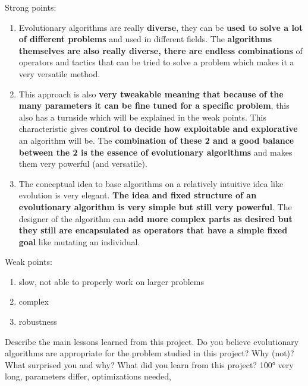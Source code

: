 \documentclass[a4paper,10pt]{article}
\newcommand{\ReplaceMe}[1]{{\color{blue}#1}}
\begin{document}
Strong points:
\begin{enumerate}
 \item Evolutionary algorithms are really \textbf{diverse}, they can be \textbf{used to solve a lot of different problems} and used in different fields. The \textbf{algorithms themselves are also really diverse, there are endless combinations} of operators and tactics that can be tried to solve a problem which makes it a very versatile method.
 \item This approach is also \textbf{very tweakable meaning that because of the many parameters it can be fine tuned for a specific problem}, this also has a turnside which will be explained in the weak points. This characteristic gives \textbf{control to decide how exploitable and explorative} an algorithm will be. The \textbf{combination of these 2 and a good balance between the 2 is the essence of evolutionary algorithms} and makes them very powerful (and versatile).
 \item The conceptual idea to base algorithms on a relatively intuitive idea like evolution is very elegant. \textbf{The idea and fixed structure of an evolutionary algorithm is very simple but still very powerful}. The designer of the algorithm can \textbf{add more complex parts as desired but they still are encapsulated as operators that have a simple fixed goal} like mutating an individual.  
\end{enumerate}
Weak points:
\begin{enumerate}
 \item slow, not able to properly work on larger problems
 \item complex
 \item robustness
\end{enumerate}

\ReplaceMe{Describe the main lessons learned from this project. Do you believe evolutionary algorithms are appropriate for the problem studied in this project? Why (not)? What surprised you and why? What did you learn from this project?}
100° very long, parameters differ, optimizations needed,
\end{document}
